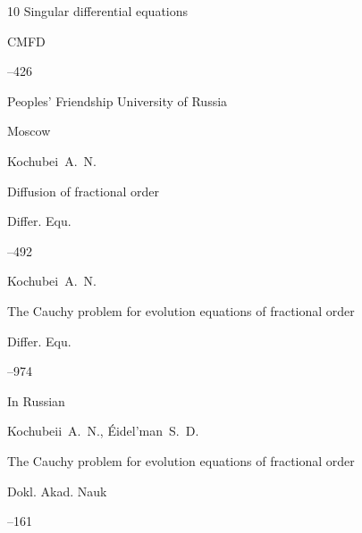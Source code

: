 \begin{thebibliography}{10}
\inbook Singular differential equations

\serial CMFD




--426

\publ Peoples' Friendship University of Russia

\publaddr Moscow









\by Kochubei~A.~N.

\paper Diffusion of fractional order

\jour Differ. Equ.




--492








\by Kochubei~A.~N.

\paper The Cauchy problem for evolution equations of fractional order

\jour Differ. Equ.




--974




\lang In Russian

\by Kochubeii~A.~N., \'Eidel'man~S.~D.

\paper The Cauchy problem for evolution equations of fractional order

\jour Dokl. Akad. Nauk




--161









\end{thebibliography}
